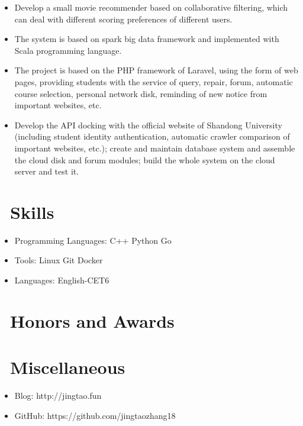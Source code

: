 \documentclass{resume}
\begin{document}
\begin{itemize}[topsep = 0 pt, partopsep = 0pt]
  \item Develop a small movie recommender based on collaborative filtering, which can deal with different scoring preferences of different users.
  \item The system is based on spark big data framework and implemented with Scala programming language.
\end{itemize}

\begin{itemize}[topsep = 0 pt, partopsep = 0pt]
  \item The project is based on the PHP framework of Laravel, using the form of web pages, providing students with the service of query, repair, forum, automatic course selection, personal network disk, reminding of new notice from important websites, etc.
  \item Develop the API docking with the official website of Shandong University (including student identity authentication, automatic crawler comparison of important websites, etc.); create and maintain database system and assemble the cloud disk and forum modules; build the whole system on the cloud server and test it.
\end{itemize}

\section{\faCogs\ Skills}
\begin{itemize}[parsep=0.5ex]
  \item Programming Languages: C++ Python Go
  \item Tools: Linux Git Docker
  \item Languages: English-CET6
\end{itemize}

\section{\faHeartO\ Honors and Awards}

\section{\faInfo\ Miscellaneous}
\begin{itemize}[parsep=0.5ex]
  \item Blog: http://jingtao.fun
  \item GitHub: https://github.com/jingtaozhang18
\end{itemize}
\end{document}
